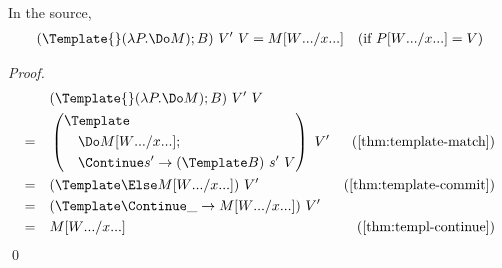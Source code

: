 \begin{lemma}
  \label{thm:template-do-match}
  In the source,
  \begin{align*}
    (\Template{} (\lambda P. \Do M); B) ~ V' ~ V
    &=
    M\subst{\many{x}}{\many{W}}
    &(\text{if } P\subst{\many{x}}{\many{W}} = V)  
  \end{align*}
\end{lemma}
\begin{proof}
  \begin{align*}
    &\quad
    (\Template{} (\lambda P. \Do M); B) ~ V' ~ V
    \\
    =&\quad
    \left(
      \begin{aligned}
        &\Template \\
        &\quad \Do M\subst{\many{x}}{\many{W}}; \\
        &\quad \Continue s' \to (\Template B) ~ s' ~ V
      \end{aligned}
    \right)
    ~ V'
    &(\cref{thm:template-match})
    \\
    =&\quad
    (\Template \Else M\subst{\many{x}}{\many{W}})
    ~ V'
    &(\cref{thm:template-commit})
    \\
    =&\quad
    (\Template \Continue \_ \to  M\subst{\many{x}}{\many{W}})
    ~ V'
    \\
    =&\quad
    M\subst{\many{x}}{\many{W}}    
    &(\cref{thm:templ-continue})
  \end{align*}
  \qed

\end{proof}
